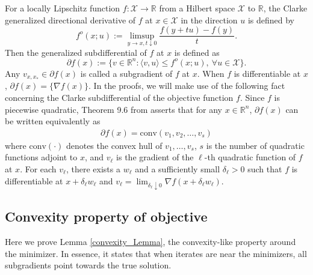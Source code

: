 \documentclass[11pt]{article}
\newcommand{\R}{\mathbb{R}}
\begin{document}
For a locally Lipschitz function $f : \mathcal{X} \rightarrow \R$ from a Hilbert space $\mathcal{X}$ to $\R$, the Clarke generalized directional derivative  \cite{Clason2017} of $f$ at $x \in \mathcal{X}$ in the direction $u$ is defined by 
    $$f^o(x;u) := \limsup_{y \rightarrow x, t \downarrow 0} \frac{f(y+tu) - f(y)}{t}.$$ Then the generalized subdifferential of $f$ at $x$ is defined as $$\partial f(x) := \{v \in \R^n : \langle v, u \rangle \leqslant f^o(x;u),\ \forall u \in \mathcal{X}\}.$$
 Any $v_{x,x_*} \in \partial f(x)$ is called a subgradient of $f$ at $x$. When $f$ is differentiable at $x$, $\partial f(x) = \{\nabla f(x)\}$. In the proofs, we will make use of the following fact concerning the Clarke subdifferential of the objective function $f$. Since $f$ is piecewise quadratic, Theorem 9.6 from \cite{Clason2017} asserts that for any $x \in \R^n$, $\partial f(x)$ can be written equivalently as \begin{align}
    \partial f(x) = \text{conv}(v_1,v_2,\dots,v_{s})  \label{subdifferential_definition}
\end{align} where $\text{conv}(\cdot)$ denotes the convex hull of $v_1,\dots,v_s$, $s$ is the number of quadratic functions adjoint to $x$, and $v_{\ell}$ is the gradient of the $\ell$-th quadratic function of $f$ at $x$. For each $v_{\ell}$, there exists a $w_{\ell}$ and a sufficiently small $\delta_{\ell} > 0$ such that $f$ is differentiable at $x + \delta_{\ell} w_{\ell}$ and $v_{\ell} = \lim_{\delta_{\ell} \downarrow 0} \nabla f(x + \delta_{\ell}w_{\ell})$.


\subsection{Convexity property of objective} \label{proofs_section_conv}

Here we prove Lemma \ref{convexity_Lemma}, the convexity-like property around the minimizer. In essence, it states that when iterates are near the minimizers, all subgradients point towards the true solution.
\end{document}
